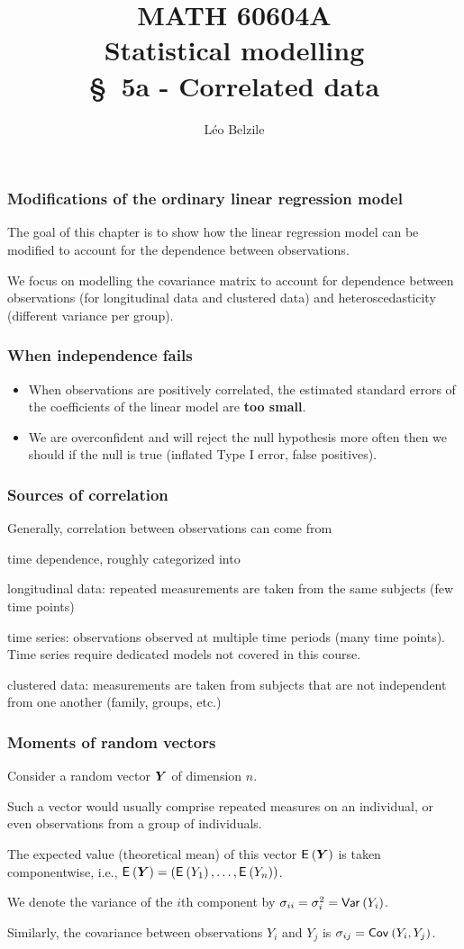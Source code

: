 \documentclass{beamer}
\title[\color{white}{MATH 60604A \S~5a - Correlated data}]{\texorpdfstring{MATH 60604A \\Statistical modelling \\ \S~5a - Correlated data}{MATH 60604A \\Statistical modelling \\ \S~5a - Correlated data}}
\author{Léo Belzile}
\institute{HEC Montréal\\
Department of Decision Sciences}
\date{}
\begin{document}
\frame{\titlepage}
\begin{frame}
\frametitle{Modifications of the ordinary linear regression model}
\bi \item The goal of this chapter is to show how the linear regression model can be modified to account for the dependence between observations.
\item 
We focus on modelling the covariance matrix to account for dependence between observations (for longitudinal data and clustered data) and heteroscedasticity (different variance per group).
\ei

\end{frame}
\begin{frame}
 \frametitle{When independence fails}
 \begin{itemize}
  \item When observations are positively correlated, the estimated standard errors of the coefficients of the linear model are \textbf{too small}.
  \item We are overconfident and will reject the null hypothesis more often then we should if the null is true (inflated Type I error, false positives).
  
  \end{itemize}
  \end{frame}
  \begin{frame}
  \frametitle{Sources of correlation}
  Generally, correlation between observations can come from 
\bi
\item  time dependence, roughly categorized into
\bi \item longitudinal data: repeated measurements are taken from the same subjects (few time points)
\item time series: observations observed at multiple time periods (many time points). Time series require dedicated models not covered in this course.
\ei 
\item  clustered data: measurements are taken from subjects that are not independent from one another (family, groups, etc.)
\ei
\end{frame}


\begin{frame}
\frametitle{Moments of random vectors}
\bi
\item Consider a \alert{random vector} $\boldsymbol {Y}$ of dimension $n$. 
\bi
\item Such a vector would usually comprise
repeated measures on an individual, or even observations from a group of individuals. 
\ei
\item The expected value (theoretical mean) of this vector ${\mathsf E}_{}\left(\boldsymbol {Y}\right)$ is taken componentwise, i.e., ${\mathsf E}_{}\left(\boldsymbol {Y}\right) = ({\mathsf E}_{}\left(Y_1\right), \ldots, {\mathsf E}_{}\left(Y_n\right))$.
\item We denote the variance of the $i$th component by $\sigma_{ii} = \sigma^2_i={\mathsf{Var}_{}}\left(Y_i\right)$.
\item Similarly, the covariance between observations $Y_i$ and $Y_j$ is  $\sigma_{ij}={\mathsf{Cov}_{}}\left(Y_i, Y_j\right)$.
\ei
\end{frame}
\end{document}
